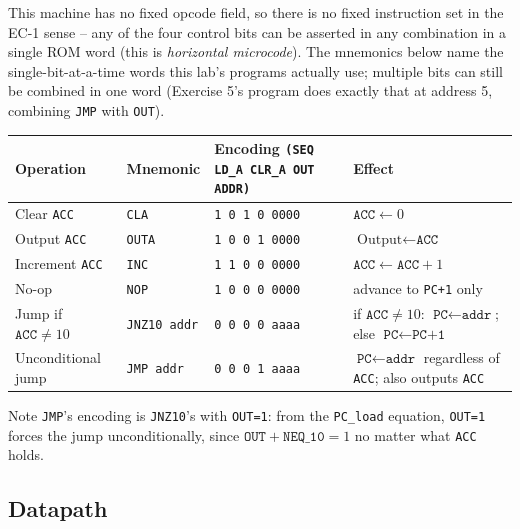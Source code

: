 \documentclass[11pt]{article}
\begin{document}
\begin{summary}
This machine has no fixed opcode field, so there is no fixed instruction set in
the EC-1 sense -- any of the four control bits can be asserted in any
combination in a single ROM word (this is \emph{horizontal microcode}). The
mnemonics below name the single-bit-at-a-time words this lab's programs
actually use; multiple bits can still be combined in one word (Exercise 5's
program does exactly that at address 5, combining \texttt{JMP} with \texttt{OUT}).
\begin{center}
\small
\begin{tabular}{@{}p{2.5cm}p{1.7cm}p{3.3cm}p{6.4cm}@{}}
\toprule
\textbf{Operation} & \textbf{Mnemonic} & \textbf{Encoding} \newline\texttt{(SEQ LD\_A CLR\_A OUT ADDR)} & \textbf{Effect} \\
\midrule
Clear \texttt{ACC}         & \texttt{CLA}       & \texttt{1 0 1 0 0000} & $\texttt{ACC} \leftarrow 0$ \\
Output \texttt{ACC}        & \texttt{OUTA}      & \texttt{1 0 0 1 0000} & $\text{Output} \leftarrow \texttt{ACC}$ \\
Increment \texttt{ACC}     & \texttt{INC}       & \texttt{1 1 0 0 0000} & $\texttt{ACC} \leftarrow \texttt{ACC}+1$ \\
No-op                   & \texttt{NOP}       & \texttt{1 0 0 0 0000} & advance to \texttt{PC+1} only \\
Jump if $\texttt{ACC}\neq 10$ & \texttt{JNZ10 addr} & \texttt{0 0 0 0 aaaa} & if $\texttt{ACC}\neq 10$: $\texttt{PC}\leftarrow\texttt{addr}$; else $\texttt{PC}\leftarrow\texttt{PC+1}$ \\
Unconditional jump      & \texttt{JMP addr}  & \texttt{0 0 0 1 aaaa} & $\texttt{PC}\leftarrow\texttt{addr}$ regardless of \texttt{ACC}; also outputs \texttt{ACC} \\
\bottomrule
\end{tabular}
\end{center}
Note \texttt{JMP}'s encoding is \texttt{JNZ10}'s with \texttt{OUT=1}: from the
\texttt{PC\_load} equation, \texttt{OUT=1} forces the jump unconditionally, since
$\texttt{OUT}+\texttt{NEQ\_10}=1$ no matter what \texttt{ACC} holds.
\end{summary}

\subsection*{Datapath}
\end{document}
